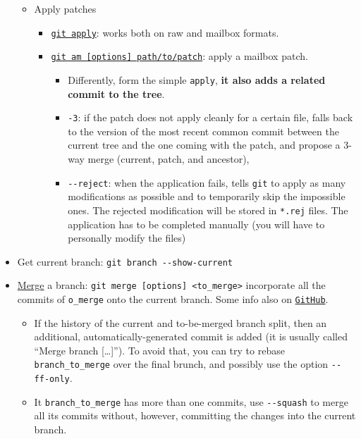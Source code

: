 \documentclass[a4paper,12pt,%
              final%
              ]{article}
\begin{document}
\begin{itemize}
\begin{itemize}
\begin{itemize}
\begin{itemize}
            \end{itemize}
        \end{itemize}
      \item Apply patches
        \begin{itemize}
          \item \href{https://git-scm.com/docs/git-apply}{\texttt{git apply}}: works both on raw and mailbox formats.
          \item \href{https://git-scm.com/docs/git-am}{\texttt{git am [options] path/to/patch}}: apply a mailbox patch.
            \begin{itemize}
              \item Differently, form the simple \texttt{apply}, \textbf{it also adds a related commit to the tree}.
              \item \texttt{-3}: if the patch does not apply cleanly for a certain file, falls back to the version of the most recent common commit between the current tree and the one coming with the patch, and propose a 3-way merge (current, patch, and ancestor),
              \item \verb|--reject|: when the application fails, tells \texttt{git} to apply as many modifications as possible and to temporarily skip the impossible ones. The rejected modification will be stored in \texttt{*.rej} files. The application has to be completed manually (you will have to personally modify the files)
            \end{itemize}
        \end{itemize}
    \end{itemize}
  \item Get current branch: \verb|git branch --show-current|
  \item \href{https://git-scm.com/docs/git-merge}{Merge} a branch: \verb|git merge [options] <to_merge>| incorporate all the commits of \verb|o_merge| onto the current branch. Some info also on \href{https://docs.github.com/en/github/collaborating-with-issues-and-pull-requests/about-pull-request-merges}{\texttt{GitHub}}.
    \begin{itemize}
      \item If the history of the current and to-be-merged branch split, then an additional, automatically-generated commit is added (it is usually called ``Merge branch [\ldots]''). To avoid that, you can try to rebase \verb|branch_to_merge| over the final brunch, and possibly use the option \verb|--ff-only|.
      \item It \verb|branch_to_merge| has more than one commits, use \verb|--squash| to merge all its commits without, however, committing the changes into the current branch.

\end{itemize}
\end{itemize}
\end{document}
